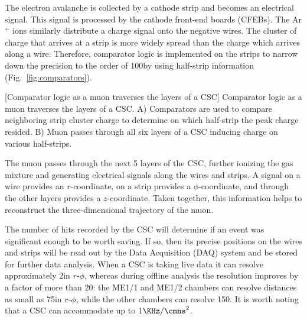 The electron avalanche is collected by a cathode strip and becomes an electrical signal.
This signal is processed by the cathode front-end boards (CFEBs).
The Ar$^+$ ions similarly distribute a charge signal onto the negative wires.
The cluster of charge that arrives at a strip is more widely spread than the charge which arrives along a wire.
Therefore, comparator logic is implemented on the strips to narrow down the precision to the order of 100\mum by using half-strip information (Fig.~\ref{fig:comparators}).
\begin{multiFigure}
    \centering
        [Comparator logic as a muon traverses the layers of a CSC]
        {Comparator logic as a muon traverses the layers of a CSC.
        \;A) Comparators are used to compare neighboring strip cluster charge to determine on which half-strip the peak charge resided.
        \;B) Muon passes through all six layers of a CSC inducing charge on various half-strips.
        }
    \label{fig:comparators}
\end{multiFigure}

The muon passes through the next 5 layers of the CSC, further ionizing the gas mixture and generating electrical signals along the wires and strips.
A signal on a wire provides an $r$-coordinate, on a strip provides a $\phi$-coordinate, and through the other layers provides a $z$-coordinate.
Taken together, this information helps to reconstruct the three-dimensional trajectory of the muon.

The number of hits recorded by the CSC will determine if an event was significant enough to be worth saving.
If so, then its precise positions on the wires and strips will be read out by the Data Acquisition (DAQ) system and be stored for further data analysis.
When a CSC is taking live data it can resolve approximately 2\mm in $r$-$\phi$, whereas during offline analysis the resolution improves by a factor of more than 20:
the ME1/1 and ME1/2 chambers can resolve distances as small as 75\mum in $r$-$\phi$, while the other chambers can resolve 150\mum.
It is worth noting that a CSC can accommodate up to 1$\KHz/\cmns^2$.



